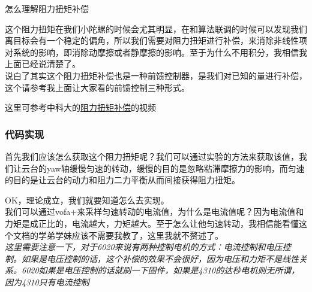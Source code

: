 \documentclass[UTF8,a4paper,12pt]{ctexart}
\begin{document}
\begin{titlebox}{怎么理解阻力扭矩补偿}
\begin{flushleft}
{            }
           \end{flushleft}
           \begin{flushleft}
            这个阻力扭矩在我们小陀螺的时候会尤其明显，在和算法联调的时候可以发现我们离目标会有一个稳定的偏角，所以我们需要对阻力扭矩进行补偿，来消除非线性项对系统的影响，即消除动摩擦或者静摩擦的影响。至于为什么不用积分，我相信我上面已经说清楚了。
            \\说白了其实这个阻力扭矩补偿也是一种前馈控制器，是我们对已知的量进行补偿，这个请参考我上面让大家看的前馈控制三种形式。
           \end{flushleft}
           
           
          \end{titlebox}
          这里可参考中科大的\href {https://www.bilibili.com/video/BV1xJo4YPEuS?spm_id_from=333.788.videopod.sectionsvd_source=b02f21f21dd17ebeef8dac9338c9d06c}{阻力扭矩补偿}的视频
          \subsubsection{代码实现}
          \begin{flushleft}
            首先我们应该怎么获取这个阻力扭矩呢？我们可以通过实验的方法来获取该值，我们让云台的yaw轴缓慢匀速的转动，缓慢的目的是忽略粘滞摩擦力的影响，而匀速的目的是让云台的动力和阻力二力平衡从而间接获得阻力扭矩。\\
            
          \end{flushleft}
          \begin{flushleft}
            OK，理论成立，我们就要知道怎么去实现。\\
            我们可以通过vofa+来采样匀速转动的电流值，为什么是电流值呢？因为电流值和力矩是成正比的，电流越大，力矩越大。至于怎么让他匀速转动，我相信能看懂这个文档的学弟学妹应该不需要我教了，这里我就不赘述了。\\
            \textit{这里需要注意一下，对于6020来说有两种控制电机的方式：电流控制和电压控制。如果是电压控制的话，这个补偿的效果不会很好，因为电压和力矩不是线性关系。6020如果是电压控制的话就刷一下固件，如果是4310的达秒电机则无所谓，因为4310只有电流控制}
          \end{flushleft} 
          
\end{document}
